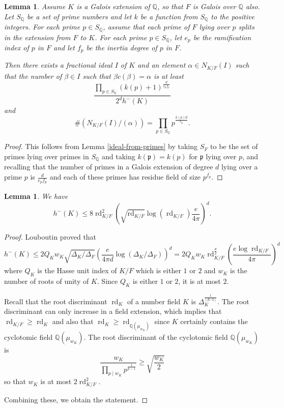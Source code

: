 \documentclass[12pt]{amsart}
\newtheorem{lemma}[theo]{Lemma}
\theoremstyle{remark}
\theoremstyle{definition}
\begin{document}
\begin{lemma}\label{galois-case} Assume $K$ is a Galois extension of $\mathbb Q$, so that $F$ is Galois over $\mathbb Q$ also. Let $S_\mathbb Q$ be a set of prime numbers and let $k$ be a function from $S_\mathbb Q$ to the positive integers. For each prime  $p\in S_{\mathbb Q}$, assume that each prime of $F$ lying over $p$ splits in the extension from $F$ to $K$.  For each prime $p\in S_{\mathbb Q}$, let $e_p$ be the ramification index of $p$ in $F$ and let $f_p$ be the inertia degree of $p$ in $F$.

Then there exists a fractional ideal $I$ of $K$ and an element $\alpha \in N_{K/F}(I)$ such that the number of $\beta \in I$ such that $\beta c(\beta)=\alpha$ is at least \[ \frac{ \prod_{ p \in S_\mathbb Q} (k(p)+1  )^{\frac{d}{ e_p f_p}}}{ 2^d h^{-}(K)} \] and  
\[ \# (N_{K/F}(I)/(\alpha)) = \prod_{p \in S_\mathbb Q} p^{\frac{k(p) d}{e_p}}.\] \end{lemma}
\begin{proof} This follows from Lemma \ref{ideal-from-primes} by taking $S_F$ to be the set of primes lying over primes in $S_{\mathbb Q}$ and taking $k(\mathfrak p)=k(p)$ for $\mathfrak p$ lying over $p$, and recalling that the number of primes in a Galois extension of degree $d$ lying over a prime $p$ is $\frac{d}{ e_p f_p}$ and each of these primes has residue field of size $p^{f_p}$. \end{proof}



\begin{lemma}\label{class-group-bound} We have
\[ h^{-}(K) \leq 8  \operatorname{rd}_{K/F}^2 \left(\sqrt{\operatorname{rd}_{K/F} } \log(\operatorname{rd}_{K/F}) \frac{e}{4\pi} \right)^d . \] 
\end{lemma}

\begin{proof} Louboutin \cite[Corollary 3]{Louboutin2000} proved that
\[ h^{-}(K) \leq  2 Q_K w_K \sqrt{\Delta_K/\Delta_F} \left( \frac{e}{4\pi d} \log ( \Delta_K/\Delta_F) \right)^d = 2 Q_K w_K \operatorname{rd}_{K/F}^{\frac{d}{2} } \left( \frac{e \log \operatorname{rd}_{K/F}}{4\pi  }\right)^d \]
where $Q_K$ is the Hasse unit index of $K/F$ which is either $1$ or $2$ and $w_K$ is the number of roots of unity of $K$. Since $Q_K$ is either $1$ or $2$, it is at most $2$.

Recall that the root discriminant $\operatorname{rd}_K$ of a number field $K$ is $\Delta_K^{\frac{1}{[K:\mathbb Q]}}$. The root discriminant can only increase in a field extension, which implies that $\operatorname{rd}_{K/F} \geq \operatorname{rd}_K $ and also that $\operatorname{rd}_K \geq \operatorname{rd}_{ \mathbb Q(\mu_{w_K})}$ since $K$ certainly contains the cyclotomic field $\mathbb Q(\mu_{w_K})$.  The root discriminant of the cyclotomic field $\mathbb Q( \mu_{w_K})$ is \cite[Proposition 2.7]{Washington1997} \[\frac{w_K}{ \prod_{p \mid w_K} p^{ \frac{1}{p-1}} }\geq \sqrt{\frac{w_K}{2}}\]  so that $w_K$ is at most $2 \operatorname{rd}_{K/F}^2$.

Combining these, we obtain the statement. \end{proof}
\end{document}
